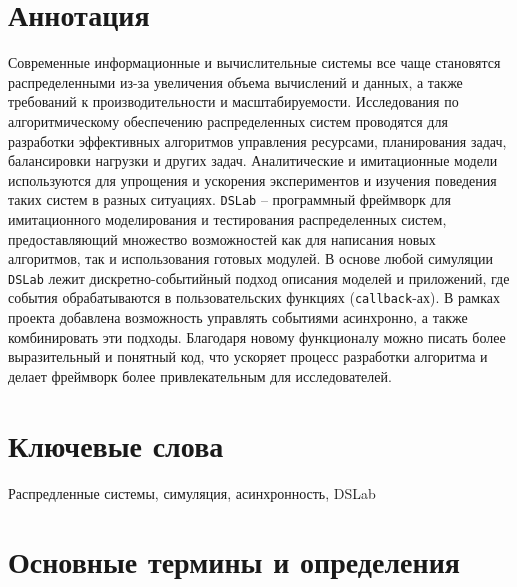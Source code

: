 
\section*{Аннотация}

Современные информационные и вычислительные системы все чаще становятся распределенными из-за увеличения объема вычислений и данных, а также требований к производительности и масштабируемости. Исследования по алгоритмическому обеспечению распределенных систем проводятся для разработки эффективных алгоритмов управления ресурсами, планирования задач, балансировки нагрузки и других задач. Аналитические и имитационные модели используются для упрощения и ускорения экспериментов и изучения поведения таких систем в разных ситуациях.
\texttt{DSLab} -- программный фреймворк для имитационного моделирования и тестирования распределенных систем, предоставляющий множество возможностей как для написания новых алгоритмов, так и использования готовых модулей. В основе любой симуляции \texttt{DSLab} лежит дискретно-событийный подход описания моделей и приложений, где события обрабатываются в пользовательских функциях (\texttt{callback}-ах). В рамках проекта добавлена возможность управлять событиями асинхронно, а также комбинировать эти подходы. Благодаря новому функционалу можно писать более выразительный и понятный код, что ускоряет процесс разработки алгоритма и делает фреймворк более привлекательным для исследователей. 

\section*{Ключевые слова}

Распредленные системы, симуляция, асинхронность, DSLab


\newpage 

\section{Основные термины и определения}

